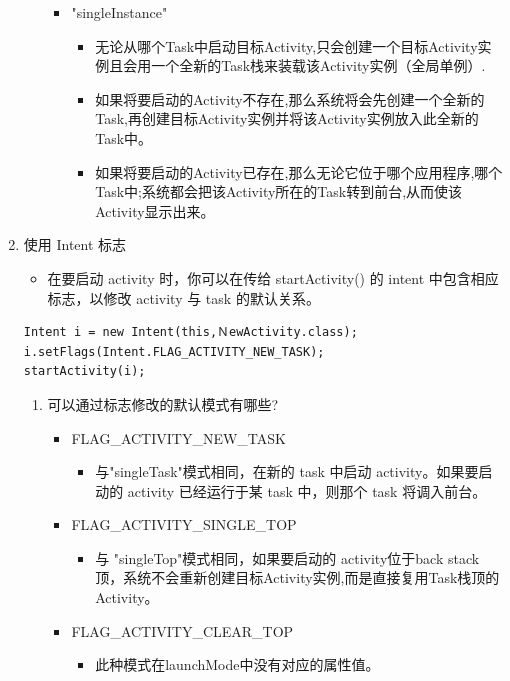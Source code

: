 \documentclass[9pt, b5paper]{article}
\begin{document}
\begin{enumerate}
\begin{enumerate}
\begin{itemize}
\begin{itemize}
\end{itemize}
\item "singleInstance"　
\begin{itemize}
\item 无论从哪个Task中启动目标Activity,只会创建一个目标Activity实例且会用一个全新的Task栈来装载该Activity实例（全局单例）.
\item 如果将要启动的Activity不存在,那么系统将会先创建一个全新的Task,再创建目标Activity实例并将该Activity实例放入此全新的Task中。
\item 如果将要启动的Activity已存在,那么无论它位于哪个应用程序,哪个Task中;系统都会把该Activity所在的Task转到前台,从而使该Activity显示出来。
\end{itemize}
\end{itemize}
\end{enumerate}
\item 使用 Intent 标志
\label{sec-1-3-3-2}
\begin{itemize}
\item 在要启动 activity 时，你可以在传给 startActivity() 的 intent 中包含相应标志，以修改 activity 与 task 的默认关系。
\end{itemize}
\begin{verbatim}
Intent i = new Intent(this,ＮewActivity.class);
i.setFlags(Intent.FLAG_ACTIVITY_NEW_TASK);
startActivity(i);
\end{verbatim}
\begin{enumerate}
\item 可以通过标志修改的默认模式有哪些?
\label{sec-1-3-3-2-1}
\begin{itemize}
\item FLAG\_ACTIVITY\_NEW\_TASK
\begin{itemize}
\item 与"singleTask"模式相同，在新的 task 中启动 activity。如果要启动的 activity 已经运行于某 task 中，则那个 task 将调入前台。
\end{itemize}
\item FLAG\_ACTIVITY\_SINGLE\_TOP
\begin{itemize}
\item 与 "singleTop"模式相同，如果要启动的 activity位于back stack 顶，系统不会重新创建目标Activity实例,而是直接复用Task栈顶的Activity。
\end{itemize}
\item FLAG\_ACTIVITY\_CLEAR\_TOP
\begin{itemize}
\item 此种模式在launchMode中没有对应的属性值。

\end{itemize}
\end{itemize}
\end{enumerate}
\end{enumerate}
\end{document}
